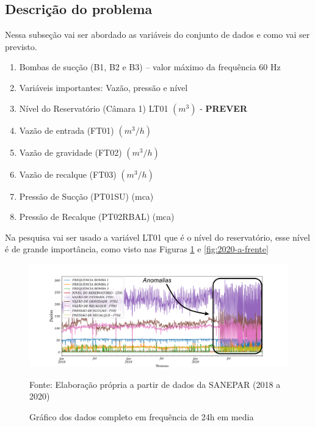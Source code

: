 \subsection{Descrição do problema} \label{subsec:descricao}

Nessa subseção vai ser abordado as variáveis do conjunto de dados e como vai ser previsto.

\begin{enumerate}[label={$\blacktriangleright$ }]
\item Bombas de sucção (B1, B2 e B3) – valor máximo da frequência 60 Hz

\item[] Variáveis importantes: Vazão, pressão e nível

\item Nível do Reservatório (Câmara 1) LT01 $ (m^3) $ - \textbf{PREVER}

\item Vazão de entrada (FT01) $ (m^3/h) $

\item Vazão de gravidade (FT02) $ (m^3/h) $

\item Vazão de recalque (FT03) $ (m^3/h) $

\item Pressão de Sucção (PT01SU) (mca)

\item Pressão de Recalque (PT02RBAL) (mca)
\end{enumerate}


Na pesquisa vai ser usado a variável LT01 que é o nível do reservatório, esse nível é de grande importância, como visto nas Figuras \ref{fig:dados-todos} e \ref{fig:2020-a-frente} 

\begin{figure}[H]
	\centering
	\caption{Gráfico dos dados completo em frequência de 24h em media}
	\label{fig:dados-todos}
	\includegraphics[width=1\linewidth]{"Introducao/Figuras/dados todos"}
	
	Fonte: Elaboração própria a partir de dados da SANEPAR (2018 a 2020)
\end{figure}

